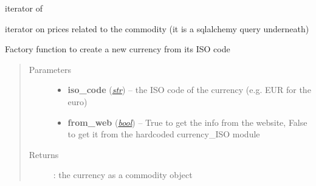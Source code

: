 \documentclass[letterpaper,10pt,english]{sphinxmanual}
\begin{document}
\begin{fulllineitems}
\begin{fulllineitems}
\begin{itemize}
\end{itemize}

\end{fulllineitems}


\begin{fulllineitems}
\label{api/piecash.model_core.commodity:piecash.model_core.commodity.Commodity.prices}
iterator of {\hyperref[api/piecash.model_core.commodity:piecash.model_core.commodity.Price]{}}

iterator on prices related to the commodity (it is a sqlalchemy query underneath)

\end{fulllineitems}


\begin{fulllineitems}
\label{api/piecash.model_core.commodity:piecash.model_core.commodity.Commodity.create_currency_from_ISO}
Factory function to create a new currency from its ISO code
\begin{quote}\begin{description}
\item[{Parameters}] \leavevmode\begin{itemize}
\item {} 
\textbf{iso\_code} (\href{http://docs.python.org/library/functions.html\#str}{\emph{str}}) -- the ISO code of the currency (e.g. EUR for the euro)

\item {} 
\textbf{from\_web} (\href{http://docs.python.org/library/functions.html\#bool}{\emph{bool}}) -- True to get the info from the website, False to get it from the hardcoded currency\_ISO module

\end{itemize}

\item[{Returns}] \leavevmode
{\hyperref[api/piecash.model_core.commodity:piecash.model_core.commodity.Commodity]{}}: the currency as a commodity object

\end{description}\end{quote}


\end{fulllineitems}
\end{fulllineitems}
\end{document}
